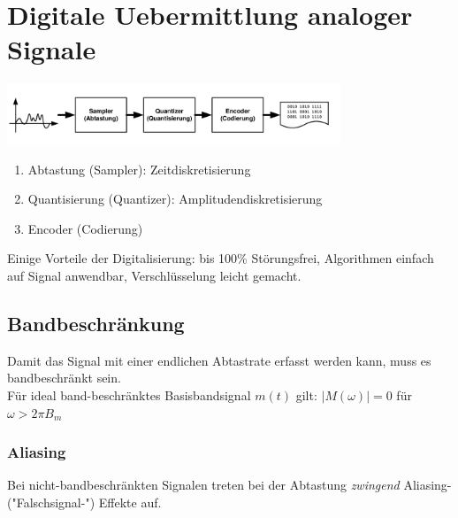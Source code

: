 \section{Digitale Uebermittlung analoger Signale }

\begin{center}
	\includegraphics[width=10cm]{bilder/dig_pcm_blockdiagramm.png}
\end{center}
\begin{enumerate}
  \item Abtastung (Sampler): Zeitdiskretisierung 
  \item Quantisierung (Quantizer): Amplitudendiskretisierung
  \item Encoder (Codierung)
\end{enumerate}

Einige Vorteile der Digitalisierung: bis 100\% Störungsfrei, Algorithmen
einfach auf Signal anwendbar, Verschlüsselung leicht gemacht.

\subsection{Bandbeschränkung}
	Damit das Signal mit einer endlichen Abtastrate erfasst werden kann, muss es bandbeschr\"ankt sein.\\
	F\"ur ideal band-beschränktes Basisbandsignal $m(t)$ gilt: $|M(\omega)| = 0$ für $\omega > 2\pi B_m$ 
\subsubsection{Aliasing}
	Bei nicht-bandbeschränkten Signalen treten bei der Abtastung \textit{zwingend} Aliasing-("Falschsignal-") Effekte auf.

